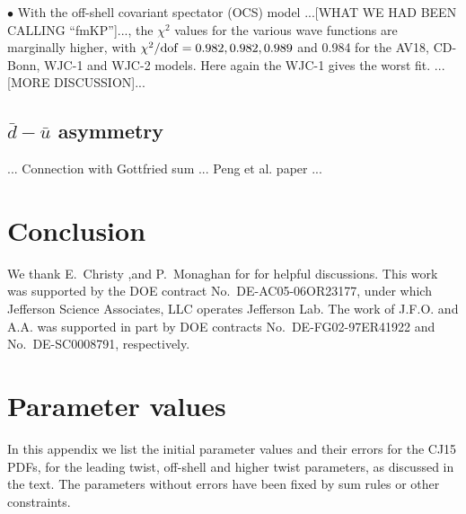 \documentclass[aps,prd,amsmath,preprint]{revtex4}
\begin{document}
$\bullet$
With the off-shell covariant spectator (OCS) model
...[WHAT WE HAD BEEN CALLING ``fmKP'']...,
the $\chi^2$ values for the various wave functions are marginally higher,
with $\chi^2/{\rm dof} = 0.982, 0.982, 0.989$ and 0.984 for the
AV18, CD-Bonn, WJC-1 and WJC-2 models.  Here again the WJC-1 gives
the worst fit.
...[MORE DISCUSSION]...


\subsection{$\bar d - \bar u$ asymmetry}
\label{ssec:dubar}


... Connection with Gottfried sum ... Peng et al. paper ...




\section{Conclusion}
\label{sec:conclusion}



\acknowledgments

We thank E.~Christy ,and P.~Monaghan for for helpful discussions.
This work was supported by the DOE contract No.~DE-AC05-06OR23177,
under which Jefferson Science Associates, LLC operates Jefferson Lab.
The work of J.F.O. and A.A. was supported in part by DOE contracts
No.~DE-FG02-97ER41922 and No.~DE-SC0008791, respectively.


\newpage
\appendix
\section{Parameter values}
\label{app:param}

In this appendix we list the initial parameter values and their errors
for the CJ15 PDFs, for the leading twist, off-shell and higher twist
parameters, as discussed in the text.  The parameters without errors
have been fixed by sum rules or other constraints.
\end{document}
